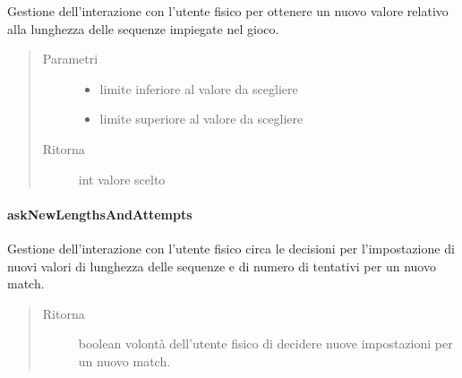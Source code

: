 \documentclass[letterpaper,10pt,italian,openany,oneside]{sphinxmanual}
\begin{document}
\begin{fulllineitems}
\label{\detokenize{source/it/unicam/cs/pa/mastermind/ui/StartView:it.unicam.cs.pa.mastermind.ui.StartView.askNewLength(int, int)}}
Gestione dell’interazione con l’utente fisico per ottenere un nuovo valore relativo alla lunghezza delle sequenze impiegate nel gioco.
\begin{quote}\begin{description}
\item[{Parametri}] \leavevmode\begin{itemize}
\item {} 
 \textendash{} limite inferiore al valore da scegliere

\item {} 
 \textendash{} limite superiore al valore da scegliere

\end{itemize}

\item[{Ritorna}] \leavevmode
int valore scelto

\end{description}\end{quote}

\end{fulllineitems}



\paragraph{askNewLengthsAndAttempts}
\label{\detokenize{source/it/unicam/cs/pa/mastermind/ui/StartView:asknewlengthsandattempts}}

\begin{fulllineitems}
\label{\detokenize{source/it/unicam/cs/pa/mastermind/ui/StartView:it.unicam.cs.pa.mastermind.ui.StartView.askNewLengthsAndAttempts()}}
Gestione dell’interazione con l’utente fisico circa le decisioni per l’impostazione di nuovi valori di lunghezza delle sequenze e di numero di tentativi per un nuovo match.
\begin{quote}\begin{description}
\item[{Ritorna}] \leavevmode
boolean volontà dell’utente fisico di decidere nuove impostazioni per un nuovo match.

\end{description}\end{quote}

\end{fulllineitems}
\end{document}
